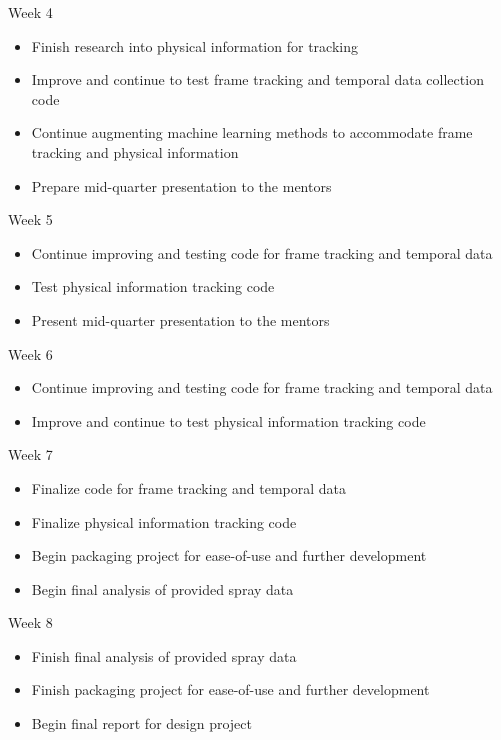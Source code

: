 \documentclass[12pt]{amsart}
\begin{document}
Week 4
\vspace*{-11pt}
\begin{itemize}
	\item Finish research into physical information for tracking
	\item Improve and continue to test frame tracking and temporal data collection code
	\item Continue augmenting machine learning methods to accommodate frame tracking and physical information
	\item Prepare mid-quarter presentation to the mentors
\end{itemize}

Week 5
\vspace*{-11pt}
\begin{itemize}
	\item Continue improving and testing code for frame tracking and temporal data 
	\item Test physical information tracking code
	\item Present mid-quarter presentation to the mentors
\end{itemize}

Week 6 
\vspace*{-11pt}
\begin{itemize}
	\item Continue improving and testing code for frame tracking and temporal data 
	\item Improve and continue to test physical information tracking code
\end{itemize}

Week 7
\vspace*{-11pt}
\begin{itemize}
	\item Finalize code for frame tracking and temporal data 
	\item Finalize physical information tracking code
	\item Begin packaging project for ease-of-use and further development 
	\item Begin final analysis of provided spray data
\end{itemize}

Week 8
\vspace*{-11pt}
\begin{itemize}
	\item Finish final analysis of provided spray data 
	\item Finish packaging project for ease-of-use and further development
	\item Begin final report for design project
\end{itemize}
\end{document}
